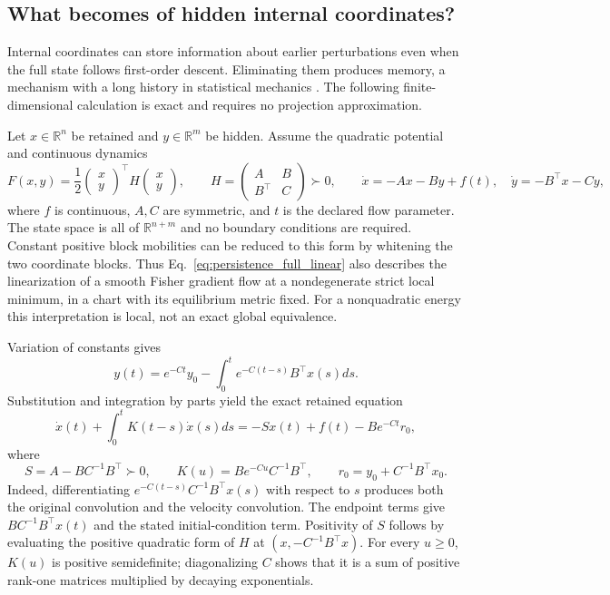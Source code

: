 \subsection{What becomes of hidden internal coordinates?}
\label{sec:persistence_memory}

Internal coordinates can store information about earlier perturbations even when the full state follows first-order descent. Eliminating them produces memory, a mechanism with a long history in statistical mechanics \cite{Zwanzig1961Memory,Mori1965Transport}. The following finite-dimensional calculation is exact and requires no projection approximation.

Let $x\in\mathbb R^n$ be retained and $y\in\mathbb R^m$ be hidden. Assume the quadratic potential and continuous dynamics
\begin{equation}
 F(x,y)=\frac12
 \begin{pmatrix}x\\y\end{pmatrix}^{\top}
 H\begin{pmatrix}x\\y\end{pmatrix},\qquad
 H=\begin{pmatrix}A&B\\B^\top&C\end{pmatrix}\succ0,
 \qquad
 \dot x=-Ax-By+f(t),\quad \dot y=-B^\top x-Cy,
 \label{eq:persistence_full_linear}
\end{equation}
where $f$ is continuous, $A,C$ are symmetric, and $t$ is the declared flow parameter. The state space is all of $\mathbb R^{n+m}$ and no boundary conditions are required. Constant positive block mobilities can be reduced to this form by whitening the two coordinate blocks. Thus Eq.~\eqref{eq:persistence_full_linear} also describes the linearization of a smooth Fisher gradient flow at a nondegenerate strict local minimum, in a chart with its equilibrium metric fixed. For a nonquadratic energy this interpretation is local, not an exact global equivalence.

Variation of constants gives
\begin{equation}
 y(t)=e^{-Ct}y_0-\int_0^t e^{-C(t-s)}B^\top x(s)ds.
\end{equation}
Substitution and integration by parts yield the exact retained equation
\begin{equation}
 \dot x(t)+\int_0^t K(t-s)\dot x(s)ds
 =-Sx(t)+f(t)-Be^{-Ct}r_0,
 \label{eq:persistence_memory_equation}
\end{equation}
where
\begin{equation}
 S=A-BC^{-1}B^\top\succ0,\qquad
 K(u)=Be^{-Cu}C^{-1}B^\top,\qquad
 r_0=y_0+C^{-1}B^\top x_0.
 \label{eq:persistence_memory_kernel}
\end{equation}
Indeed, differentiating $e^{-C(t-s)}C^{-1}B^\top x(s)$ with respect to $s$ produces both the original convolution and the velocity convolution. The endpoint terms give $BC^{-1}B^\top x(t)$ and the stated initial-condition term. Positivity of $S$ follows by evaluating the positive quadratic form of $H$ at $(x,-C^{-1}B^\top x)$. For every $u\ge0$, $K(u)$ is positive semidefinite; diagonalizing $C$ shows that it is a sum of positive rank-one matrices multiplied by decaying exponentials.

